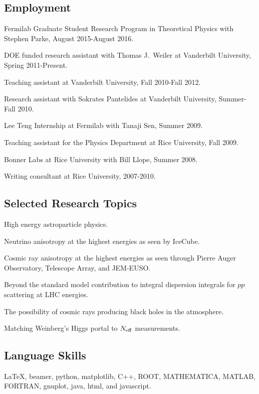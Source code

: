 \documentclass[letterpaper]{article}
\renewenvironment{itemize}{
\begin{list}{}{
\setlength{\leftmargin}{1.5em}
}
}{
\end{list}
}
\begin{document}
\subsection*{Employment}
\begin{itemize}
\item Fermilab Graduate Student Research Program in Theoretical Physics with Stephen Parke, August 2015-August 2016.
\item DOE funded research assistant with Thomas J.~Weiler at Vanderbilt University, Spring 2011-Present.
\item Teaching assistant at Vanderbilt University, Fall 2010-Fall 2012.
\item Research assistant with Sokrates Pantelides at Vanderbilt University, Summer-Fall 2010.
\item Lee Teng Internship at Fermilab with Tanaji Sen, Summer 2009.
\item Teaching assistant for the Physics Department at Rice University, Fall 2009.
\item Bonner Labs at Rice University with Bill Llope, Summer 2008.
\item Writing consultant at Rice University, 2007-2010.
\end{itemize}

\subsection*{Selected Research Topics}
\begin{itemize}
\item High energy astroparticle physics.
\item Neutrino anisotropy at the highest energies as seen by IceCube.
\item Cosmic ray anisotropy at the highest energies as seen through Pierre Auger Observatory, Telescope Array, and JEM-EUSO.
\item Beyond the standard model contribution to integral dispersion integrals for $pp$ scattering at LHC energies.
\item The possibility of cosmic rays producing black holes in the atmosphere.
\item Matching Weinberg's Higgs portal to $N_{\rm{eff}}$ measurements.
\end{itemize}

\subsection*{Language Skills}
\begin{itemize}
\item 
\LaTeX, beamer, python, matplotlib, C++, ROOT, MATHEMATICA, MATLAB, FORTRAN, gnuplot, java, html, and javascript.
\end{itemize}
\end{document}
